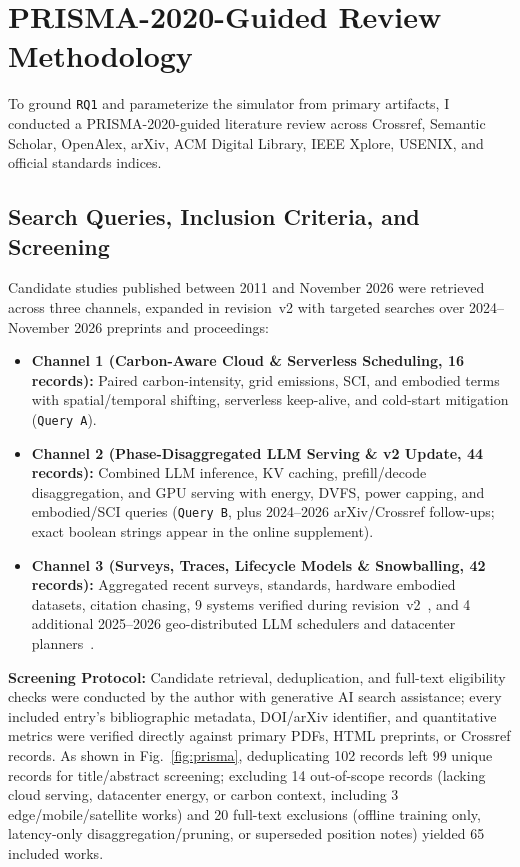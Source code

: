 \section{PRISMA-2020-Guided Review Methodology}\label{sec:methodology}

To ground \texttt{RQ1} and parameterize the simulator from primary artifacts, I conducted a PRISMA-2020-guided literature review across Crossref, Semantic Scholar, OpenAlex, arXiv, ACM Digital Library, IEEE Xplore, USENIX, and official standards indices.

\subsection{Search Queries, Inclusion Criteria, and Screening}\label{subsec:prisma_search}
Candidate studies published between 2011 and November 2026 were retrieved across three channels, expanded in revision~v2 with targeted searches over 2024--November 2026 preprints and proceedings:
\begin{itemize}
    \item \textbf{Channel 1 (Carbon-Aware Cloud \& Serverless Scheduling, 16 records):} Paired carbon-intensity, grid emissions, SCI, and embodied terms with spatial/temporal shifting, serverless keep-alive, and cold-start mitigation (\texttt{Query A}).
    \item \textbf{Channel 2 (Phase-Disaggregated LLM Serving \& v2 Update, 44 records):} Combined LLM inference, KV caching, prefill/decode disaggregation, and GPU serving with energy, DVFS, power capping, and embodied/SCI queries (\texttt{Query B}, plus 2024--2026 arXiv/Crossref follow-ups; exact boolean strings appear in the online supplement).
    \item \textbf{Channel 3 (Surveys, Traces, Lifecycle Models \& Snowballing, 42 records):} Aggregated recent surveys, standards, hardware embodied datasets, citation chasing, 9 systems verified during revision~v2~\cite{shi2024greenllm,topcu2026tension,sisodia2026sicp,zhang2026context,bernhard2026cleanest,tian2026greencache,moore2025slit,ozcan2025vidurvessim,nguyen2025sustainable}, and 4 additional 2025--2026 geo-distributed LLM schedulers and datacenter planners~\cite{he2025freesh,more2026cedar,cheng2026greenllm,tsiopani2026infactplanner}.
\end{itemize}

\textbf{Screening Protocol:} Candidate retrieval, deduplication, and full-text eligibility checks were conducted by the author with generative AI search assistance; every included entry's bibliographic metadata, DOI/arXiv identifier, and quantitative metrics were verified directly against primary PDFs, HTML preprints, or Crossref records. As shown in Fig.~\ref{fig:prisma}, deduplicating 102 records left 99 unique records for title/abstract screening; excluding 14 out-of-scope records (lacking cloud serving, datacenter energy, or carbon context, including 3 edge/mobile/satellite works) and 20 full-text exclusions (offline training only, latency-only disaggregation/pruning, or superseded position notes) yielded 65 included works.


